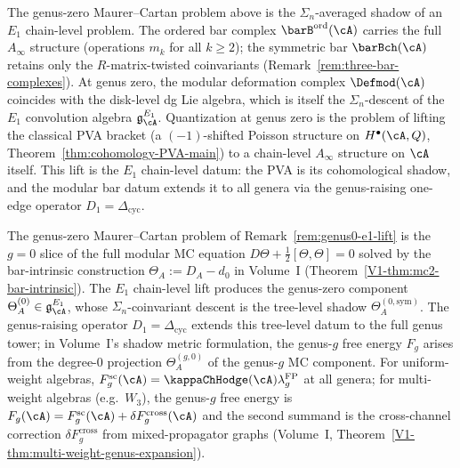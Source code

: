 \begin{remark}
\label{rem:genus0-e1-lift}%
%
%
The genus-zero Maurer--Cartan problem above is the
$\Sigma_n$-averaged shadow of an $E_1$ chain-level problem.
The ordered bar complex $\barB^{\mathrm{ord}}(\cA)$ carries the
full $A_\infty$ structure (operations $m_k$ for all $k \ge 2$);
the symmetric bar $\barBch(\cA)$ retains only the
$R$-matrix-twisted coinvariants
(Remark~\ref{rem:three-bar-complexes}). At genus zero, the
modular deformation complex $\Defmod(\cA)$ coincides with the
disk-level dg Lie algebra, which is itself the $\Sigma_n$-descent
of the $E_1$ convolution algebra
$\mathfrak{g}^{E_1}_\cA$. Quantization at genus zero
is the problem of lifting the classical PVA bracket (a
$(-1)$-shifted Poisson structure on $H^\bullet(\cA, Q)$,
Theorem~\ref{thm:cohomology-PVA-main}) to a chain-level $A_\infty$
structure on $\cA$ itself. This lift is the $E_1$ chain-level
datum: the PVA is its cohomological shadow, and the modular bar
datum extends it to all genera via the genus-raising one-edge
operator $D_1 = \Delta_{\mathrm{cyc}}$.
\end{remark}

\begin{remark}
\label{rem:genus0-quantization-vol1-shadow}%
%
%
The genus-zero Maurer--Cartan problem of
Remark~\ref{rem:genus0-e1-lift} is the $g = 0$ slice of the
full modular MC equation $D\Theta + \tfrac{1}{2}[\Theta,\Theta] = 0$
solved by the bar-intrinsic construction
$\Theta_A := D_A - d_0$ in Volume~I
(Theorem~\ref*{V1-thm:mc2-bar-intrinsic}). The $E_1$
chain-level lift produces the genus-zero component
$\Theta_A^{(0)} \in \mathfrak{g}^{E_1}_\cA$, whose
$\Sigma_n$-coinvariant descent is the tree-level shadow
$\Theta_A^{(0,\mathrm{sym})}$. The genus-raising operator
$D_1 = \Delta_{\mathrm{cyc}}$ extends this tree-level datum
to the full genus tower; in Volume~I's shadow metric
formulation, the genus-$g$ free energy $F_g$ arises from
the degree-$0$ projection $\Theta_A^{(g,0)}$ of the genus-$g$
MC component. For uniform-weight algebras,
$F_g^{\mathrm{sc}}(\cA)=\kappaChHodge(\cA)\lambda_g^{\mathrm{FP}}$ at all genera;
for multi-weight algebras (e.g.\ $W_3$), the genus-$g$
free energy is
$F_g(\cA)=F_g^{\mathrm{sc}}(\cA)+\delta F_g^{\mathrm{cross}}(\cA)$ and the
second summand is the cross-channel correction
$\delta F_g^{\mathrm{cross}}$ from mixed-propagator graphs
(Volume~I, Theorem~\ref*{V1-thm:multi-weight-genus-expansion}).
\end{remark}

